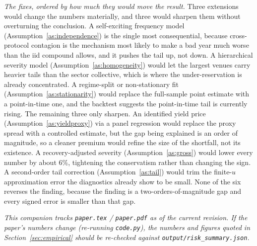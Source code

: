 \documentclass[11pt]{article}
\theoremstyle{definition}
\theoremstyle{remark}
\theoremstyle{definition}
\newcommand{\1}{\mathbf{1}}
\begin{document}
\emph{The fixes, ordered by how much they would move the result.} Three
extensions would change the numbers materially, and three would sharpen them
without overturning the conclusion. A self-exciting frequency model
(Assumption~\ref{as:independence}) is the single most consequential, because
cross-protocol contagion is the mechanism most likely to make a bad year much
worse than the iid compound allows, and it pushes the tail up, not down. A
hierarchical severity model (Assumption~\ref{as:homogeneity}) would let the
largest venues carry heavier tails than the sector collective, which is where the
under-reservation is already concentrated. A regime-split or non-stationary fit
(Assumption~\ref{as:stationarity}) would replace the full-sample point estimate
with a point-in-time one, and the backtest suggests the point-in-time tail is
currently rising. The remaining three only sharpen. An identified yield price
(Assumption~\ref{as:yieldproxy}) via a panel regression would replace the proxy
spread with a controlled estimate, but the gap being explained is an order of
magnitude, so a cleaner premium would refine the size of the shortfall, not its
existence. A recovery-adjusted severity (Assumption~\ref{as:gross}) would lower
every number by about $6\%$, tightening the conservatism rather than changing the
sign. A second-order tail correction (Assumption~\ref{as:tail}) would trim the
finite-$u$ approximation error the diagnostics already show to be small. None of
the six reverses the finding, because the finding is a two-orders-of-magnitude
gap and every signed error is smaller than that gap.

\bigskip
\noindent\textit{This companion tracks \texttt{paper.tex} / \texttt{paper.pdf}
as of the current revision. If the paper's numbers change (re-running
\texttt{code.py}), the numbers and figures quoted in
Section~\ref{sec:empirical} should be re-checked against
\texttt{output/risk\_summary.json}.}
\end{document}
